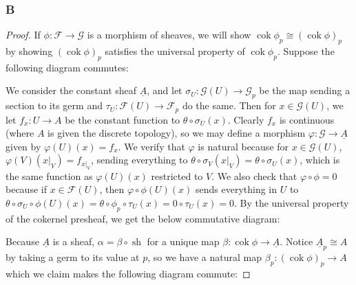 \documentclass{article}
\newcommand{\fF}{\mathscr{F}}
\newcommand{\fG}{\mathscr{G}}
\DeclareMathOperator{\cok}{cok}
\DeclareMathOperator{\cokpre}{\cok_{\text{pre}}}
\DeclareMathOperator{\sh}{sh}
\begin{document}
\subsubsection{B}\label{2.6.B}
\begin{proof}
    If $\phi:\fF\to \fG$ is a morphism of sheaves, we will show $\cok \phi_p\cong (\cok \phi)_p$ by showing $(\cok \phi)_p$ satisfies the universal property of $\cok \phi_p$. Suppose the following diagram commutes:
    \begin{center}
    \end{center}
    We consider the constant sheaf $\underline{A}$, and let $\sigma_U:\fG(U)\to \fG_p$ be the map sending a section to its germ and $\tau_U:\fF(U)\to \fF_p$ do the same. Then for $x\in \fG(U)$, we let $f_x:U\to A$ be the constant function to $\theta \circ \sigma_U(x)$. Clearly $f_x$ is continuous (where $A$ is given the discrete topology), so we may define a morphism $\varphi:\fG \to \underline{A}$ given by $\varphi(U)(x)=f_x$. We verify that $\varphi$ is natural because for $x\in \fG(U)$, $\varphi(V)(x\vert_V)=f_{x\vert_V}$, sending everything to $\theta \circ \sigma _V(x\vert_V)=\theta \circ \sigma_U(x)$, which is the same function as $\varphi(U)(x)$ restricted to $V$. We also check that $\varphi \circ \phi = 0$ because if $x\in \fF(U)$, then $\varphi \circ \phi(U)(x)$ sends everything in $U$ to $\theta \circ \sigma_U \circ \phi(U)(x) = \theta \circ \phi_p \circ \tau_U(x)=0\circ \tau_U(x)=0$. By the universal property of the cokernel presheaf, we get the below commutative diagram:
    \begin{center}
    \end{center}
    Because $\underline{A}$ is a sheaf, $\alpha=\beta \circ \sh$ for a unique map $\beta:\cok \phi \to \underline{A}$. Notice $\underline{A}_p \cong A$ by taking a germ to its value at $p$, so we have a natural map $\beta_p:(\cok \phi)_p\to A$ which we claim makes the following diagram commute:

\end{proof}
\end{document}
